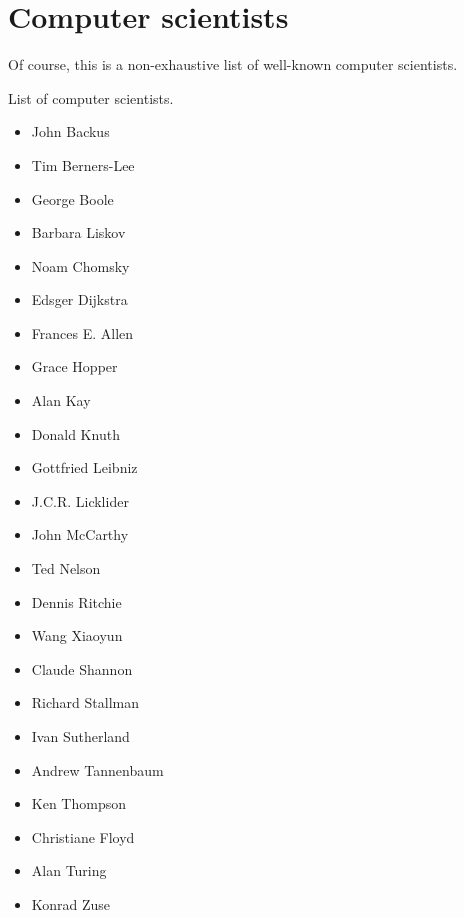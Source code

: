 \section{Computer scientists}
%
Of course, this is a non-exhaustive list of well-known computer scientists.

List of computer scientists.

\begin{itemize}
  \item John Backus
  \item Tim Berners-Lee
  \item George Boole
  \item Barbara Liskov
  \item Noam Chomsky
  \item Edsger Dijkstra
  \item Frances E. Allen
  \item Grace Hopper
  \item Alan Kay
  \item Donald Knuth
  \item Gottfried Leibniz
  \item J.C.R. Licklider
  \item John McCarthy
  \item Ted Nelson
  \item Dennis Ritchie
  \item Wang Xiaoyun
  \item Claude Shannon
  \item Richard Stallman
  \item Ivan Sutherland
  \item Andrew Tannenbaum
  \item Ken Thompson
  \item Christiane Floyd
  \item Alan Turing
  \item Konrad Zuse
\end{itemize}
